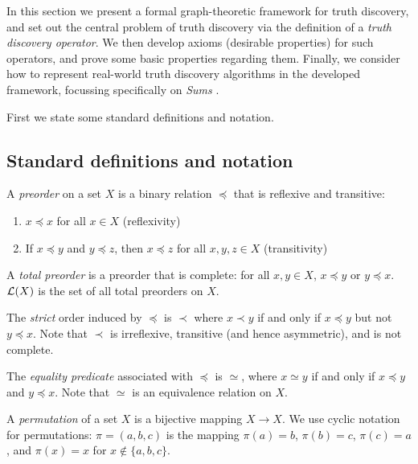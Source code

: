 \documentclass[../main.tex]{subfiles}
\begin{document}

In this section we present a formal graph-theoretic framework for truth
discovery, and set out the central problem of truth discovery via the
definition of a \emph{truth discovery operator}. We then develop axioms
(desirable properties) for such operators, and prove some basic properties
regarding them. Finally, we consider how to represent real-world truth
discovery algorithms in the developed framework, focussing specifically on
\emph{Sums} \cite{pasternack}.

First we state some standard definitions and notation.

\subsection{Standard definitions and notation}

\begin{definition}
A \emph{preorder} on a set $X$ is a binary relation $\preceq$ that is reflexive
and transitive:
\begin{enumerate}
\item $x \preceq x$ for all $x \in X$ (reflexivity)
\item If $x \preceq y$ and $y \preceq z$, then $x \preceq z$ for all $x, y, z
\in X$ (transitivity)
\end{enumerate}

A \emph{total preorder} is a preorder that is complete: for all $x, y \in X$,
$x \preceq y$ or $y \preceq x$. $\mathcal{L}(X)$ is the set of all total
preorders on $X$.

The \emph{strict} order induced by $\preceq$ is $\prec$ where $x \prec y$ if
and only if $x \preceq y$ but not $y \preceq x$. Note that $\prec$ is
irreflexive, transitive (and hence asymmetric), and is not complete.

The \emph{equality predicate} associated with $\preceq$ is $\simeq$, where $x
\simeq y$ if and only if $x \preceq y$ and $y \preceq x$. Note that $\simeq$ is
an equivalence relation on $X$.

\end{definition}

\begin{definition}
A \emph{permutation} of a set $X$ is a bijective mapping $X \rightarrow X$. We
use cyclic notation for permutations: $\pi=(a, b, c)$ is the mapping $\pi(a) =
b$, $\pi(b) = c$, $\pi(c) = a$, and $\pi(x) = x$ for $x \notin \{a, b, c\}$.
\end{definition}
\end{document}
